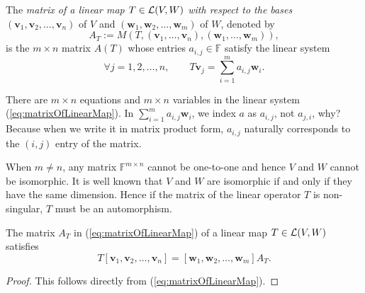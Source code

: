 \begin{defn}
  \label{def:matrixOfLinearMap}
  The \emph{matrix of a linear map
    \mbox{$T\in {\cal L}(V, W)$}
    with respect to the bases}
   $(\mathbf{v}_1, \mathbf{v}_2, \ldots, \mathbf{v}_n)$
   of $V$
   and $(\mathbf{w}_1, \mathbf{w}_2, \ldots, \mathbf{w}_m)$
   of $W$, denoted by
   \begin{equation}
    \label{eq:matrixOfLinearMap}
    A_T:=M(T, (\mathbf{v}_1, \ldots, \mathbf{v}_n),
    (\mathbf{w}_1, \ldots, \mathbf{w}_m)),
   \end{equation}
   is the $m\times n$ matrix $A(T)$
   whose entries $a_{i,j}\in \mathbb{F}$
   satisfy the linear system
   \begin{equation}
      \forall j=1,2,\ldots,n, \qquad
      T\mathbf{v}_j = \sum_{i=1}^m a_{i,j}\mathbf{w}_i.
   \end{equation}
\end{defn}

\begin{rem}
  There are $m\times n$ equations and  $m\times n$ variables
   in the linear system (\ref{eq:matrixOfLinearMap}).
  In $\sum_{i=1}^m a_{i,j}\mathbf{w}_i$,
   we index $a$ as $a_{i,j}$, not $a_{j,i}$, why?
  Because when we write it in matrix product form,
   $a_{i,j}$ naturally corresponds to the $(i,j)$ entry of the matrix.
\end{rem}

\begin{rem}
  When $m\ne n$,
   any matrix $\mathbb{F}^{m\times n}$ cannot be one-to-one
   and hence $V$ and $W$ cannot be isomorphic.
  It is well known that $V$ and $W$ are isomorphic
   if and only if they have the same dimension.
  Hence if the matrix of the linear operator $T$ is non-singular,
   $T$ must be an automorphism.
\end{rem}

\begin{coro}
  \label{coro:matrixOfLinearMap}
  The matrix $A_T$ in (\ref{eq:matrixOfLinearMap})
   of a linear map
   \mbox{$T\in {\cal L}(V, W)$}
   satisfies
  \begin{equation}
    \label{eq:relationOfLinearMapToItsMatrix}
    T [\mathbf{v}_1, \mathbf{v}_2, \ldots, \mathbf{v}_n]
    =[\mathbf{w}_1, \mathbf{w}_2, \ldots, \mathbf{w}_m] A_T.
  \end{equation}
\end{coro}
\begin{proof}
  This follows directly from (\ref{eq:matrixOfLinearMap}).
\end{proof}


